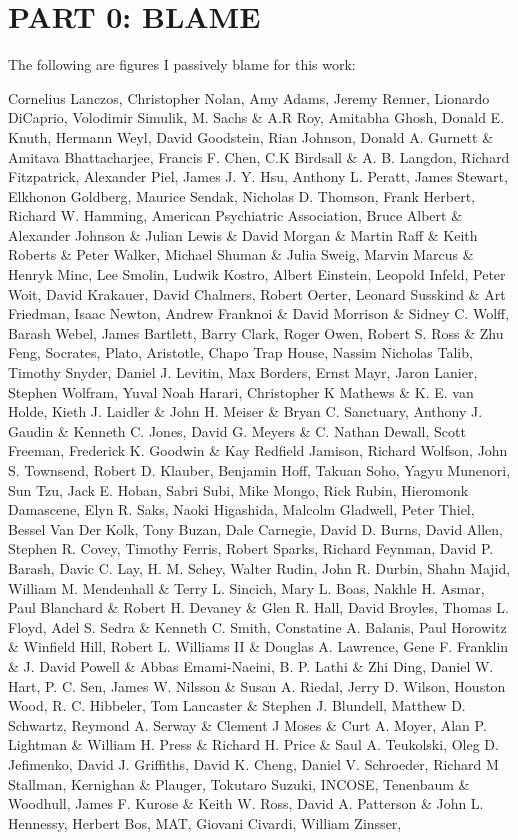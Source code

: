 \documentclass{article}
\begin{document}
\section*{PART 0: BLAME}

The following are figures I passively blame for this work:

Cornelius Lanczos, Christopher Nolan, Amy Adams, Jeremy Renner, Lionardo DiCaprio, Volodimir Simulik, M. Sachs \& A.R Roy, Amitabha Ghosh, Donald E. Knuth, Hermann Weyl, David Goodstein, Rian Johnson, Donald A. Gurnett \& Amitava Bhattacharjee, Francis F. Chen, C.K Birdsall \& A. B. Langdon, Richard Fitzpatrick, Alexander Piel, James J. Y. Hsu, Anthony L. Peratt, James Stewart, Elkhonon Goldberg, Maurice Sendak, Nicholas D. Thomson, Frank Herbert, Richard W. Hamming, American Psychiatric Association, Bruce Albert \& Alexander Johnson \& Julian Lewis \& David Morgan \& Martin Raff \& Keith Roberts \& Peter Walker, Michael Shuman \& Julia Sweig, Marvin Marcus \& Henryk Minc, Lee Smolin, Ludwik Kostro, Albert Einstein, Leopold Infeld, Peter Woit, David Krakauer, David Chalmers, Robert Oerter, Leonard Susskind \& Art Friedman, Isaac Newton, Andrew Franknoi \& David Morrison \& Sidney C. Wolff, Barash Webel, James Bartlett, Barry Clark, Roger Owen, Robert S. Ross \& Zhu Feng, Socrates, Plato, Aristotle, Chapo Trap House, Nassim Nicholas Talib, Timothy Snyder, Daniel J. Levitin, Max Borders, Ernst Mayr, Jaron Lanier, Stephen Wolfram, Yuval Noah Harari, Christopher K Mathews \& K. E. van Holde, Kieth J. Laidler \& John H. Meiser \& Bryan C. Sanctuary, Anthony J. Gaudin \& Kenneth C. Jones, David G. Meyers \& C. Nathan Dewall, Scott Freeman, Frederick K. Goodwin \& Kay Redfield Jamison, Richard Wolfson, John S. Townsend, Robert D. Klauber, Benjamin Hoff, Takuan Soho, Yagyu Munenori, Sun Tzu, Jack E. Hoban, Sabri Subi, Mike Mongo, Rick Rubin, Hieromonk Damascene, Elyn R. Saks, Naoki Higashida, Malcolm Gladwell, Peter Thiel, Bessel Van Der Kolk, Tony Buzan, Dale Carnegie, David D. Burns, David Allen, Stephen R. Covey, Timothy Ferris, Robert Sparks, Richard Feynman, David P. Barash, Davic C. Lay, H. M. Schey, Walter Rudin, John R. Durbin, Shahn Majid, William M. Mendenhall \& Terry L. Sincich, Mary L. Boas, Nakhle H. Asmar, Paul Blanchard \& Robert H. Devaney \& Glen R. Hall, David Broyles, Thomas L. Floyd, Adel S. Sedra \& Kenneth C. Smith, Constatine A. Balanis, Paul Horowitz \& Winfield Hill, Robert L. Williams II \& Douglas A. Lawrence, Gene F. Franklin \& J. David Powell \& Abbas Emami-Naeini, B. P. Lathi \& Zhi Ding, Daniel W. Hart, P. C. Sen, James W. Nilsson \& Susan A. Riedal, Jerry D. Wilson, Houston Wood, R. C. Hibbeler, Tom Lancaster \& Stephen J. Blundell, Matthew D. Schwartz, Reymond A. Serway \& Clement J Moses \& Curt A. Moyer, Alan P. Lightman \& William H. Press \& Richard H. Price \& Saul A. Teukolski, Oleg D. Jefimenko, David J. Griffiths, David K. Cheng, Daniel V. Schroeder, Richard M Stallman, Kernighan \& Plauger, Tokutaro Suzuki, INCOSE, Tenenbaum \& Woodhull, James F. Kurose \& Keith W. Ross, David A. Patterson \& John L. Hennessy, Herbert Bos, MAT, Giovani Civardi, William Zinsser, 
\end{document}

